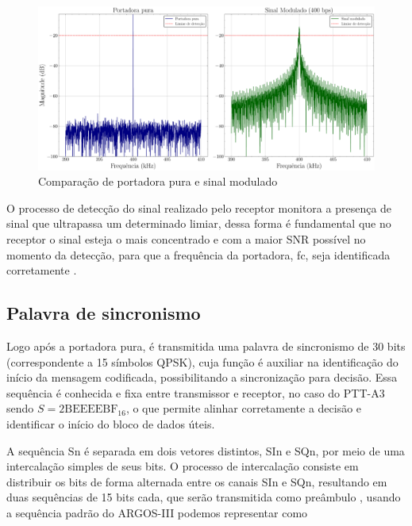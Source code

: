 \begin{figure}[H]
	\centering
	\caption{Comparação de portadora pura e sinal modulado}\label{fig:portadora_pura_freq}
	\includegraphics[width=\linewidth]{assets/cap2/carrier_spectra.pdf}
\end{figure}

O processo de detecção do sinal realizado pelo receptor monitora a presença de sinal que ultrapassa um determinado limiar, dessa forma é fundamental que no receptor o sinal esteja o mais concentrado e com a maior \gls{SNR} possível no momento da detecção, para que a frequência da portadora, \gls{fc}, seja identificada corretamente \cite{cnes_services_and_message_formats_ed2_rev2_2006}.


\subsection{Palavra de sincronismo}

Logo após a portadora pura, é transmitida uma palavra de sincronismo de 30 bits (correspondente a 15 símbolos \gls{QPSK}), cuja função é auxiliar na identificação do início da mensagem codificada, possibilitando a sincronização para decisão. Essa sequência é conhecida e fixa entre transmissor e receptor, no caso do \gls{PTT-A3} sendo $S = \text{2BEEEEBF}_{16}$, o que permite alinhar corretamente a decisão e identificar o início do bloco de dados úteis. \cite{cnes_services_and_message_formats_ed2_rev2_2006}

A sequência \gls{Sn} é separada em dois vetores distintos, \gls{SIn} e \gls{SQn}, por meio de uma intercalação simples de seus bits. O processo de intercalação consiste em distribuir os bits de forma alternada entre os canais \gls{SIn} e \gls{SQn}, resultando em duas sequências de 15 bits cada, que serão transmitida como preâmbulo \cite{cnes_services_and_message_formats_ed2_rev2_2006}, usando a sequência padrão do \gls{ARGOS-III} podemos representar como

